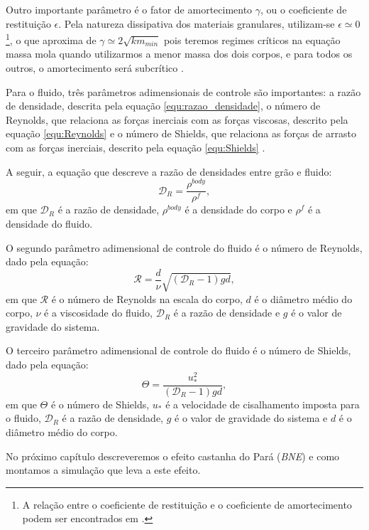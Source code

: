     Outro importante parâmetro é o fator de amortecimento $\gamma$, ou o coeficiente de restituição $\epsilon$. Pela natureza dissipativa dos materiais granulares, utilizam-se $\epsilon \simeq 0$\footnote{A relação entre o coeficiente de restituição e o coeficiente de amortecimento podem ser encontrados em \cite{Dissertacao}.}, o que aproxima de $\gamma \simeq 2\sqrt{k {m}_{min}}$ pois teremos regimes críticos na equação massa mola quando utilizarmos a menor massa dos dois corpos, e para todos os outros, o amortecimento será subcrítico \cite{Bouzid-Tese, Luding-Tese}.

    Para o fluido, três parâmetros adimensionais de controle são importantes: a razão de densidade, descrita pela equação \ref{equ:razao_densidade}, o número de Reynolds, que relaciona as forças inerciais com as forças viscosas, descrito pela equação \ref{equ:Reynolds} e o número de Shields, que relaciona as forças de arrasto com as forças inerciais, descrito pela equação \ref{equ:Shields} \cite{Numerical_simulation_of_turbulent_sediment_transport}.

    A seguir, a equação que descreve a razão de densidades entre grão e fluido:
\begin{equation}
    \label{equ:razao_densidade}
    \mathcal{D}_{R} = \frac{\rho^{body}}{\rho^{f}},
\end{equation}
em que $\mathcal{D}_{R}$ é a razão de densidade, $\rho^{body}$ é a densidade do corpo e $\rho^{f}$ é a densidade do fluido.

    O segundo parâmetro adimensional de controle do fluido é o número de Reynolds, dado pela equação:
\begin{equation}
    \label{equ:Reynolds}
    \mathcal{R} = \frac{d}{\nu}\sqrt{\left(\mathcal{D}_{R}-1\right)gd},
\end{equation}
em que $\mathcal{R}$ é o número de Reynolds na escala do corpo, $d$ é o diâmetro médio do corpo, $\nu$ é a viscosidade do fluido, $\mathcal{D}_{R}$ é a razão de densidade e $g$ é o valor de gravidade do sistema.

    O terceiro parâmetro adimensional de controle do fluido é o número de Shields, dado pela equação:
\begin{equation}
    \label{equ:Shields}
    \Theta = \frac{u_{*}^{2}}{\left(\mathcal{D}_{R}-1\right)gd},
\end{equation}
em que $\Theta$ é o número de Shields, $u_{*}$ é a velocidade de cisalhamento imposta para o fluido, $\mathcal{D}_{R}$ é a razão de densidade, $g$ é o valor de gravidade do sistema e $d$ é o diâmetro médio do corpo.

    No próximo capítulo descreveremos o efeito castanha do Pará (\textit{BNE}) e como montamos a simulação que leva a este efeito.

